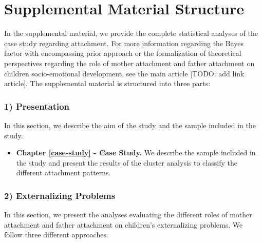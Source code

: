 \documentclass[
]{book}
\providecommand{\tightlist}{%
  \setlength{\itemsep}{0pt}\setlength{\parskip}{0pt}}
\begin{document}
\hypertarget{supplemental-material-structure}{%
\section*{Supplemental Material Structure}\label{supplemental-material-structure}}

In the supplemental material, we provide the complete statistical analyses of the case study regarding attachment. For more information regarding the Bayes factor with encompassing prior approach or the formalization of theoretical perspectives regarding the role of mother attachment and father attachment on children socio-emotional development, see the main article {[}TODO: add link article{]}. The supplemental material is structured into three parts:

\hypertarget{presentation}{%
\subsubsection*{1) Presentation}\label{presentation}}

In this section, we describe the aim of the study and the sample included in the study.

\begin{itemize}
\tightlist
\item
  \textbf{Chapter \ref{case-study} - Case Study.} We describe the sample included in the study and present the results of the cluster analysis to classify the different attachment patterns.
\end{itemize}

\hypertarget{externalizing-problems}{%
\subsubsection*{2) Externalizing Problems}\label{externalizing-problems}}

In this section, we present the analyses evaluating the different roles of mother attachment and father attachment on children's externalizing problems. We follow three different approaches.
\end{document}

